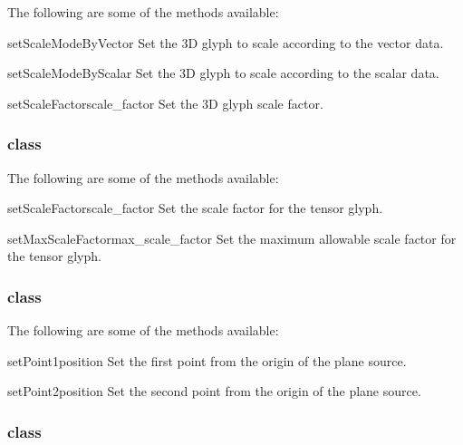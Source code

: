 The following are some of the methods available:

\begin{methoddesc}[Glyph3D]{setScaleModeByVector}{}
Set the 3D glyph to scale according to the vector data.
\end{methoddesc}

\begin{methoddesc}[Glyph3D]{setScaleModeByScalar}{}
Set the 3D glyph to scale according to the scalar data.
\end{methoddesc}

\begin{methoddesc}[Glyph3D]{setScaleFactor}{scale_factor}
Set the 3D glyph scale factor.
\end{methoddesc}

\subsubsection{\TensorGlyph class}

The following are some of the methods available:

\begin{methoddesc}[TensorGlyph]{setScaleFactor}{scale_factor}
Set the scale factor for the tensor glyph.
\end{methoddesc}

\begin{methoddesc}[TensorGlyph]{setMaxScaleFactor}{max_scale_factor}
Set the maximum allowable scale factor for the tensor glyph.
\end{methoddesc}

\subsubsection{\PlaneSource class}

The following are some of the methods available:

\begin{methoddesc}[PlaneSource]{setPoint1}{position}
Set the first point from the origin of the plane source.
\end{methoddesc}

\begin{methoddesc}[PlaneSource]{setPoint2}{position}
Set the second point from the origin of the plane source.
\end{methoddesc}

\subsubsection{\PointSource class}

